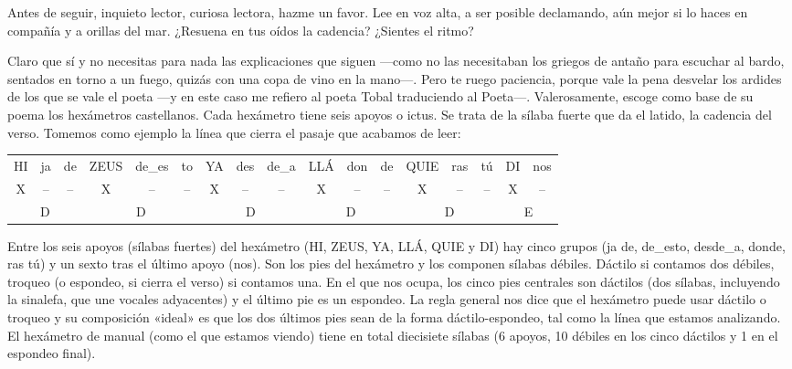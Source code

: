 Antes de seguir, inquieto lector, curiosa lectora, hazme un favor. Lee en voz alta, a ser posible declamando, aún mejor si lo haces en compañía y a orillas del mar. ¿Resuena en tus oídos la cadencia? ¿Sientes el ritmo?

Claro que sí y no necesitas para nada las explicaciones que siguen ---como no las necesitaban los griegos de antaño para escuchar al bardo, sentados en torno a un fuego, quizás con una copa de vino en la mano---. Pero te ruego paciencia, porque vale la pena desvelar los ardides de los que se vale el poeta ---y en este caso me refiero al poeta Tobal traduciendo al Poeta---. Valerosamente, escoge como base de su poema los hexámetros castellanos. Cada hexámetro tiene seis apoyos o ictus. Se trata de la sílaba fuerte que da el latido, la cadencia del verso. Tomemos como ejemplo la línea que cierra el pasaje que acabamos de leer:

\begin{center}
\small\setlength{\tabcolsep}{3pt}
\begin{tabular}{ccc|ccc|ccc|ccc|ccc|cc}
HI & ja & de & ZEUS & de\_es & to & YA & des & de\_a & LLÁ & don & de & QUIE & ras & tú & DI & nos \\
X & -- & -- & X & -- & -- & X & -- & -- & X & -- & -- & X & -- & -- & X & -- \\
\multicolumn{3}{c|}{D} & \multicolumn{3}{c|}{D} & \multicolumn{3}{c|}{D} & \multicolumn{3}{c|}{D} & \multicolumn{3}{c|}{D} & \multicolumn{2}{c}{E} \\
\end{tabular}
\end{center}

Entre los seis apoyos (sílabas fuertes) del hexámetro (HI, ZEUS, YA, LLÁ, QUIE y DI) hay cinco grupos (ja de, de\_esto, desde\_a, donde, ras tú) y un sexto tras el último apoyo (nos). Son los pies del hexámetro y los componen sílabas débiles. Dáctilo si contamos dos débiles, troqueo (o espondeo, si cierra el verso) si contamos una. En el que nos ocupa, los cinco pies centrales son dáctilos (dos sílabas, incluyendo la sinalefa, que une vocales adyacentes) y el último pie es un espondeo. La regla general nos dice que el hexámetro puede usar dáctilo o troqueo y su composición «ideal» es que los dos últimos pies sean de la forma dáctilo-espondeo, tal como la línea que estamos analizando. El hexámetro de manual (como el que estamos viendo) tiene en total diecisiete sílabas (6 apoyos, 10 débiles en los cinco dáctilos y 1 en el espondeo final).

